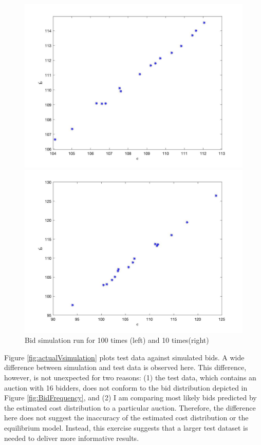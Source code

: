 \documentclass[11pt]{article}
\begin{document}
\begin{figure}
\centering
    \begin{minipage}[h]{0.5\textwidth}
        \centering 
        \includegraphics[width=\linewidth]{100run.jpg}
    \end{minipage}%
    \begin{minipage}[h]{0.5\textwidth}
        \centering
        \includegraphics[width=\linewidth]{10run.jpg}
    \end{minipage}
\caption{Bid simulation run for 100 times (left) and 10 times(right)}
\label{fig:simulation_run_times}
\end{figure}

Figure \ref{fig:actualVsimulation} plots test data against simulated bids. 
A wide difference between simulation and test data is observed here. 
This difference, however, is not unexpected for two reasons: 
(1) the test data, which contains an auction with 16 bidders, does not conform 
to the bid distribution depicted in Figure \ref{fig:BidFrequency}, and 
(2) I am comparing most likely bids predicted by the estimated cost distribution 
to a particular auction. Therefore, the difference here does not suggest the 
inaccuracy of the estimated cost distribution or the equilibrium model. 
Instead, this exercise suggests that a larger test dataset is needed 
to deliver more informative results. 
\end{document}
